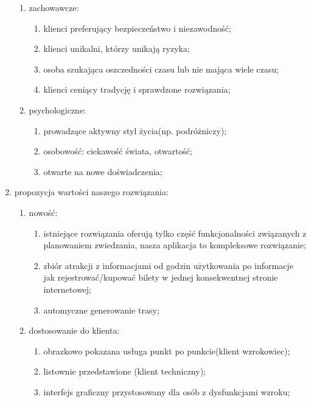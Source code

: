 \begin{enumerate}[label=\Roman*.]
\begin{enumerate}[label=\alph*.]
        \item zachowawcze:
        \begin{enumerate}[label=\roman*.]
            \item klienci preferujący bezpieczeństwo i niezawodność;
            \item klienci unikalni, którzy unikają ryzyka;
            \item osoba szukająca oszczedności czasu lub nie mająca wiele czasu;
            \item klienci ceniący tradycję i sprawdzone rozwiązania;
        \end{enumerate}
        \item psychologiczne:
        \begin{enumerate}[label=\roman*.]
            \item prowadzące aktywny styl życia(np. podróżniczy);
            \item osobowość: ciekawość świata, otwartość;
            \item otwarte na nowe doświadczenia;
        \end{enumerate}
    \end{enumerate}
    \item propozycja wartości naszego rozwiązania:
    \begin{enumerate}[label=\alph*.]
        \item nowość:
        \begin{enumerate}[label=\roman*.]
            \item istniejące rozwiązania oferują tylko część funkcjonalności związanych z planowaniem zwiedzania, nasza aplikacja to kompleksowe rozwiązanie;
            \item zbiór atrakcji z informacjami od godzin użytkowania po informacje jak rejestrować/kupować bilety w jednej konsekwentnej stronie internetowej;
            \item automyczne generowanie trasy;
        \end{enumerate}
        \item dostosowanie do klienta:
        \begin{enumerate}[label=\roman*.]
            \item obrazkowo pokazana usługa punkt po punkcie(klient wzrokowiec);
            \item listownie przedstawione  (klient techniczny);
            \item interfejs graficzny przystosowany dla osób z dysfunkcjami wzroku;

\end{enumerate}
\end{enumerate}
\end{enumerate}
